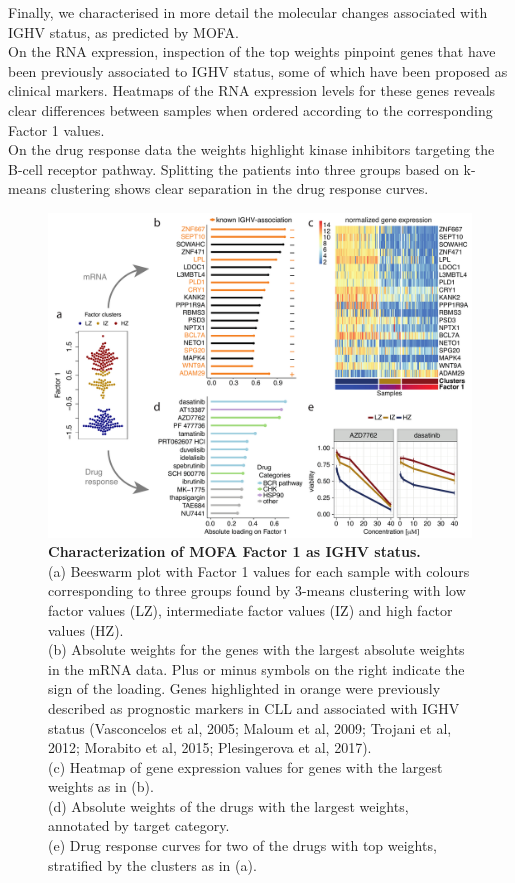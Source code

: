 Finally, we characterised in more detail the molecular changes associated with IGHV status, as predicted by MOFA.\\
On the RNA expression, inspection of the top weights pinpoint genes that have been previously associated to IGHV status, some of which have been proposed as clinical markers\cite{Vasconcelos2005,Maloum2009,Trojani2011,Morabito2015,Plesingerova2017}. Heatmaps of the RNA expression levels for these genes reveals clear differences between samples when ordered according to the corresponding Factor 1 values.\\
On the drug response data the weights highlight kinase inhibitors targeting the B-cell receptor pathway. Splitting the patients into three groups based on k-means clustering shows clear separation in the drug response curves.

\begin{figure}[H]
	\centering 	
	\includegraphics[width=1.0\textwidth]{MOFA_CLL_Factor1}
	\caption{
	\textbf{Characterization of MOFA Factor 1 as IGHV status.}\\
	(a) Beeswarm plot with Factor 1 values for each sample with colours corresponding to three groups found by 3-means clustering with low factor values (LZ), intermediate factor values (IZ) and high factor values (HZ).\\
	(b) Absolute weights for the genes with the largest absolute weights in the mRNA data. Plus or minus symbols on the right indicate the sign of the loading. Genes highlighted in orange were previously described as prognostic markers in CLL and associated with IGHV status (Vasconcelos et al, 2005; Maloum et al, 2009; Trojani et al, 2012; Morabito et al, 2015; Plesingerova et al, 2017).\\
	(c) Heatmap of gene expression values for genes with the largest weights as in (b).\\
	(d) Absolute weights of the drugs with the largest weights, annotated by target category.\\
	(e) Drug response curves for two of the drugs with top weights, stratified by the clusters as in (a).
	}
	\label{fig:MOFA_CLL_Factor1}
\end{figure}

